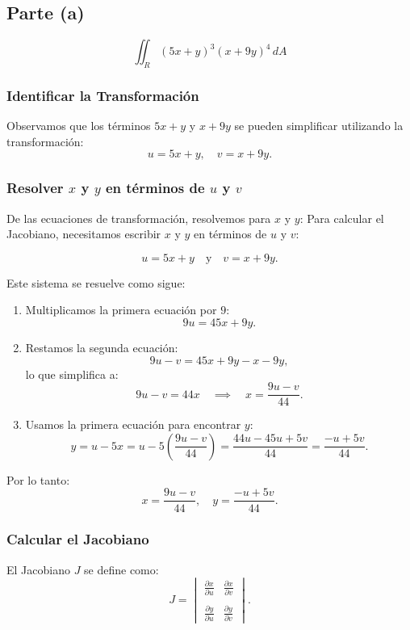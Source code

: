 \subsection*{Parte (a)}
\[
\iint_R (5x + y)^3 (x + 9y)^4 \, dA
\]

\subsubsection*{Identificar la Transformación}
Observamos que los términos \(5x + y\) y \(x + 9y\) se pueden simplificar utilizando la transformación:
\[
u = 5x + y, \quad v = x + 9y.
\]

\subsubsection*{Resolver \(x\) y \(y\) en términos de \(u\) y \(v\)}
De las ecuaciones de transformación, resolvemos para \(x\) y \(y\):
Para calcular el Jacobiano, necesitamos escribir \(x\) y \(y\) en términos de \(u\) y \(v\):

\[
u = 5x + y \quad \text{y} \quad v = x + 9y.
\]

Este sistema se resuelve como sigue:

\begin{enumerate}[label=\arabic*.]
    \item Multiplicamos la primera ecuación por \(9\):
    \[
    9u = 45x + 9y.
    \]

    \item Restamos la segunda ecuación:
    \[
    9u - v = 45x + 9y - x - 9y,
    \]
    lo que simplifica a:
    \[
    9u - v = 44x \quad \implies \quad x = \frac{9u - v}{44}.
    \]

    \item Usamos la primera ecuación para encontrar \(y\):
    \[
    y = u - 5x = u - 5 \left( \frac{9u - v}{44} \right) = \frac{44u - 45u + 5v}{44} = \frac{-u + 5v}{44}.
    \]

\end{enumerate}

Por lo tanto:
\[
x = \frac{9u - v}{44}, \quad y = \frac{-u + 5v}{44}.
\]



\subsubsection*{Calcular el Jacobiano}
El Jacobiano \(J\) se define como:
\[
J = \begin{vmatrix}
\frac{\partial x}{\partial u} & \frac{\partial x}{\partial v} \\\\
\frac{\partial y}{\partial u} & \frac{\partial y}{\partial v}
\end{vmatrix}.
\]

